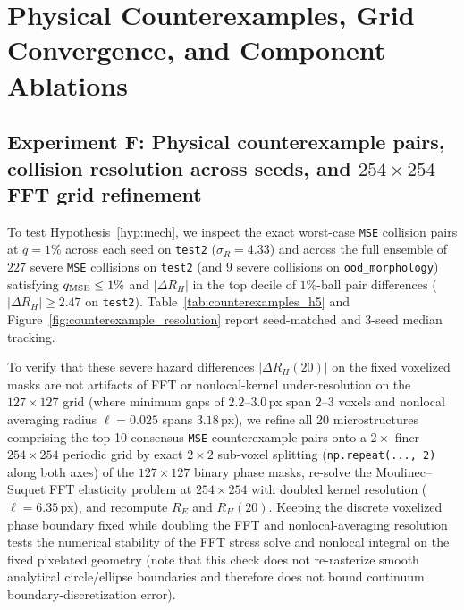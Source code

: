 \documentclass[preprint,11pt,a4paper]{elsarticle}
\begin{document}
\begin{enumerate}
\end{enumerate}

\section{Physical Counterexamples, Grid Convergence, and Component Ablations}
\label{sec:counterexamples_ablations}

\subsection{Experiment F: Physical counterexample pairs, collision resolution across seeds, and $254\times 254$ FFT grid refinement}
\label{sec:counterexamples}

To test Hypothesis~\ref{hyp:mech}, we inspect the exact worst-case \texttt{MSE} collision pairs at $q=1\%$ across each seed on \texttt{test2} ($\sigma_R=4.33$) and across the full ensemble of $227$ severe \texttt{MSE} collisions on \texttt{test2} (and $9$ severe collisions on \texttt{ood\_morphology}) satisfying $q_{\rm MSE}\le 1\%$ and $|\Delta R_H|$ in the top decile of $1\%$-ball pair differences ($|\Delta R_H|\ge 2.47$ on \texttt{test2}). Table~\ref{tab:counterexamples_h5} and Figure~\ref{fig:counterexample_resolution} report seed-matched and 3-seed median tracking.

To verify that these severe hazard differences $|\Delta R_H(20)|$ on the fixed voxelized masks are not artifacts of FFT or nonlocal-kernel under-resolution on the $127\times 127$ grid (where minimum gaps of $2.2\text{--}3.0$\,px span $2\text{--}3$ voxels and nonlocal averaging radius $\ell=0.025$ spans $3.18$\,px), we refine all 20 microstructures comprising the top-10 consensus \texttt{MSE} counterexample pairs onto a $2\times$ finer $254\times 254$ periodic grid by exact $2\times 2$ sub-voxel splitting (\texttt{np.repeat(..., 2)} along both axes) of the $127\times 127$ binary phase masks, re-solve the Moulinec--Suquet FFT elasticity problem at $254\times 254$ with doubled kernel resolution ($\ell=6.35$\,px), and recompute $R_E$ and $R_H(20)$. Keeping the discrete voxelized phase boundary fixed while doubling the FFT and nonlocal-averaging resolution tests the numerical stability of the FFT stress solve and nonlocal integral on the fixed pixelated geometry (note that this check does not re-rasterize smooth analytical circle/ellipse boundaries and therefore does not bound continuum boundary-discretization error).
\end{document}
